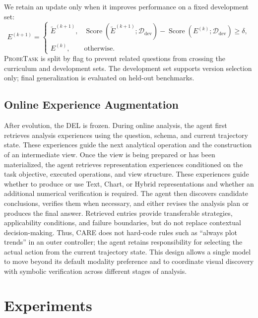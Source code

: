\documentclass{article}
\newcommand{\method}{\textsc{CARE}}
\newcommand{\probe}{\textsc{ProbeTask}}
\begin{document}
We retain an update only when it improves performance on a fixed development set:
\begin{equation}
E^{(k+1)} =
\begin{cases}
\widetilde{E}^{(k+1)}, &
\operatorname{Score}(\widetilde{E}^{(k+1)};\mathcal{D}_{\mathrm{dev}})
-
\operatorname{Score}(E^{(k)};\mathcal{D}_{\mathrm{dev}})
\geq \delta,\\
E^{(k)}, & \text{otherwise}.
\end{cases}
\label{eq:experience-gate}
\end{equation}
\probe{} is split by flag to prevent related questions from crossing the curriculum and development sets.
The development set supports version selection only; final generalization is evaluated on held-out benchmarks.

\subsection{Online Experience Augmentation}
\label{sec:online}

After evolution, the DEL is frozen.
During online analysis, the agent first retrieves analysis experiences using the question, schema, and current trajectory state.
These experiences guide the next analytical operation and the construction of an intermediate view.
Once the view is being prepared or has been materialized, the agent retrieves representation experiences conditioned on the task objective, executed operations, and view structure.
These experiences guide whether to produce or use Text, Chart, or Hybrid representations and whether an additional numerical verification is required.
The agent then discovers candidate conclusions, verifies them when necessary, and either revises the analysis plan or produces the final answer.
Retrieved entries provide transferable strategies, applicability conditions, and failure boundaries, but do not replace contextual decision-making.
Thus, \method{} does not hard-code rules such as ``always plot trends'' in an outer controller; the agent retains responsibility for selecting the actual action from the current trajectory state.
This design allows a single model to move beyond its default modality preference and to coordinate visual discovery with symbolic verification across different stages of analysis.

\section{Experiments}
\label{sec:experiments}
\end{document}
